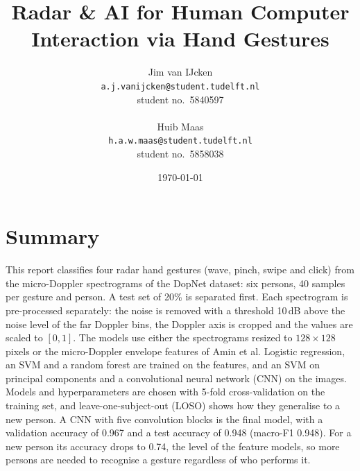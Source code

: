 \documentclass[10pt,a4paper,titlepage]{article}
\title{Radar \& AI for Human Computer Interaction via Hand Gestures}
\author{%
Jim van IJcken \\ \texttt{a.j.vanijcken@student.tudelft.nl}\\ student no.\ 5840597\\\\
Huib Maas \\ \texttt{h.a.w.maas@student.tudelft.nl}\\ student no.\ 5858038}
\date{\today}
\newcommand{\placeholder}[1]{\begin{placeholderbox}#1\end{placeholderbox}}
\begin{document}
\maketitle

\section*{Summary}

This report classifies four radar hand gestures (wave, pinch, swipe and click)
from the micro-Doppler spectrograms of the DopNet dataset: six persons, 40
samples per gesture and person. A test set of 20\% is separated first. Each
spectrogram is pre-processed separately: the noise is removed with a threshold
10\,dB above the noise level of the far Doppler bins, the Doppler axis is
cropped and the values are scaled to $[0, 1]$. The models use either the
spectrograms resized to $128 \times 128$ pixels or the micro-Doppler envelope
features of Amin et al. Logistic regression, an SVM and a random forest are
trained on the features, and an SVM on principal components and a
convolutional neural network (CNN) on the images. Models and hyperparameters
are chosen with 5-fold cross-validation on the training set, and
leave-one-subject-out (LOSO) shows how they generalise to a new person. A CNN
with five convolution blocks is the final model, with a validation accuracy of
0.967 and a test accuracy of 0.948 (macro-F1 0.948). For a new person its
accuracy drops to 0.74, the level of the feature models, so more persons are
needed to recognise a gesture regardless of who performs it.
\end{document}
